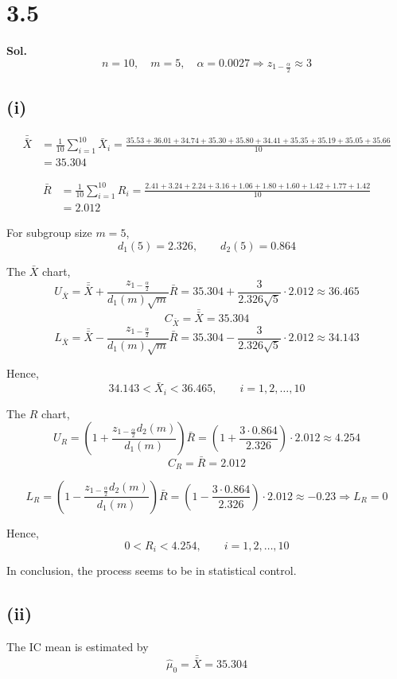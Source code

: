 \documentclass[a4paper, 12pt]{article}  %
\begin{document}
\section*{3.5}
\textbf{Sol.}
$$
n=10,\quad m=5,\quad \alpha=0.0027\Rightarrow z_{1-\frac{\alpha}{2}}\approx 3
$$

\subsection*{(i)}

\begin{align*}
\bar{\bar X}
&=\frac{1}{10}\sum_{i=1}^{10}\bar X_i
=\frac{35.53+36.01+34.74+35.30+35.80+34.41+35.35+35.19+35.05+35.66}{10} \\
&=35.304
\end{align*}

\begin{align*}
\bar R
&=\frac{1}{10}\sum_{i=1}^{10}R_i
=\frac{2.41+3.24+2.24+3.16+1.06+1.80+1.60+1.42+1.77+1.42}{10} \\
&=2.012
\end{align*}

For subgroup size \(m=5\),
$$
d_1(5)=2.326,\qquad d_2(5)=0.864
$$

The $\bar X$ chart,
$$
U_{\bar X}
=\bar{\bar X}+\frac{z_{1-\frac{\alpha}{2}}}{d_1(m)\sqrt m}\bar R
=35.304+\frac{3}{2.326\sqrt 5}\cdot2.012
\approx 36.465
$$
$$
C_{\bar X}=\bar{\bar X}=35.304
$$
$$
L_{\bar X}
=\bar{\bar X}-\frac{z_{1-\frac{\alpha}{2}}}{d_1(m)\sqrt m}\bar R
=35.304-\frac{3}{2.326\sqrt 5}\cdot2.012
\approx 34.143
$$

Hence,
$$
34.143<\bar X_i<36.465,\qquad i=1,2,\ldots,10
$$

The $R$ chart,
$$
U_R
=\left(1+\frac{z_{1-\frac{\alpha}{2}}d_2(m)}{d_1(m)}\right)\bar R
=\left(1+\frac{3\cdot 0.864}{2.326}\right)\cdot 2.012
\approx 4.254
$$
$$
C_R=\bar R=2.012
$$

$$
L_R
=\left(1-\frac{z_{1-\frac{\alpha}{2}}d_2(m)}{d_1(m)}\right)\bar R
=\left(1-\frac{3\cdot 0.864}{2.326}\right)\cdot 2.012
\approx -0.23\Rightarrow L_R=0
$$

Hence,
$$
0<R_i<4.254,\qquad i=1,2,\ldots,10
$$

In conclusion, the process seems to be in statistical control.

\subsection*{(ii)}

The IC mean is estimated by
$$
\hat{\mu}_0=\bar{\bar X}=35.304
$$
\end{document}
